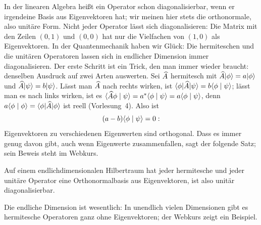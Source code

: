 In der linearen Algebra heißt ein Operator schon diagonalisierbar, wenn er irgendeine Basis aus Eigenvektoren hat; wir meinen hier stets die orthonormale, also unitäre Form. Nicht jeder Operator lässt sich diagonalisieren: Die Matrix mit den Zeilen $(0,1)$ und $(0,0)$ hat nur die Vielfachen von $(1,0)$ als Eigenvektoren. In der Quantenmechanik haben wir Glück: Die hermiteschen und die unitären Operatoren lassen sich in endlicher Dimension immer diagonalisieren. Der erste Schritt ist ein Trick, den man immer wieder braucht: denselben Ausdruck auf zwei Arten auswerten. Sei $\widehat{A}$ hermitesch mit $\widehat{A}\lvert \phi \rangle = a\lvert \phi \rangle$ und $\widehat{A}\lvert \psi \rangle = b\lvert \psi \rangle$. Lässt man $\widehat{A}$ nach rechts wirken, ist $\langle \phi \rvert \widehat{A} \lvert \psi \rangle = b\langle \phi \mid \psi \rangle$; lässt man es nach links wirken, ist es $\langle \widehat{A}\phi \mid \psi \rangle = a^*\langle \phi \mid \psi \rangle = a\langle \phi \mid \psi \rangle$, denn $a\langle \phi \mid \phi \rangle = \langle \phi \rvert \widehat{A} \lvert \phi \rangle$ ist reell (Vorlesung~4). Also ist
\begin{equation}
	(a-b)\langle \phi \mid \psi \rangle = 0:
\end{equation}
Eigenvektoren zu verschiedenen Eigenwerten sind orthogonal. Dass es immer genug davon gibt, auch wenn Eigenwerte zusammenfallen, sagt der folgende Satz; sein Beweis steht im Webkurs.
\begin{merksatz}[Spektralsatz]
	Auf einem endlichdimensionalen Hilbertraum hat jeder hermitesche und jeder unitäre Operator eine Orthonormalbasis aus Eigenvektoren, ist also unitär diagonalisierbar.
\end{merksatz}
Die endliche Dimension ist wesentlich: In unendlich vielen Dimensionen gibt es hermitesche Operatoren ganz ohne Eigenvektoren; der Webkurs zeigt ein Beispiel.

